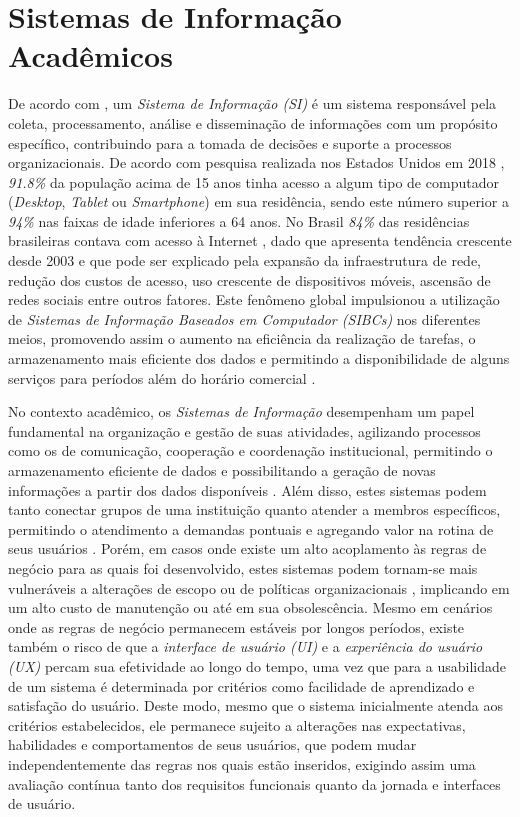 \documentclass[nonacm, sigconf]{acmart}
\begin{document}
\section{Sistemas de Informação Acadêmicos}
\label{section:academic-information-systems}

De acordo com \cite{rainer2015introducao}, um \textit{Sistema de Informação (SI)} é um sistema responsável pela coleta, processamento, análise e disseminação de informações com um propósito específico, contribuindo para a tomada de decisões e suporte a processos organizacionais. De acordo com pesquisa realizada nos Estados Unidos em 2018 \cite{martin2021computer}, \textit{91.8\%} da população acima de 15 anos tinha acesso a algum tipo de computador (\textit{Desktop}, \textit{Tablet} ou \textit{Smartphone}) em sua residência, sendo este número superior a \textit{94\%} nas faixas de idade inferiores a 64 anos. No Brasil \textit{84\%} das residências brasileiras contava com acesso à Internet \cite{ticbr2023}, dado que apresenta tendência crescente desde 2003 e que pode ser explicado pela expansão da infraestrutura de rede, redução dos custos de acesso, uso crescente de dispositivos móveis, ascensão de redes sociais entre outros fatores. Este fenômeno global impulsionou a utilização de \textit{Sistemas de Informação Baseados em Computador (SIBCs)} nos diferentes meios, promovendo assim o aumento na eficiência da realização de tarefas, o armazenamento mais eficiente dos dados e permitindo a disponibilidade de alguns serviços para períodos além do horário comercial \cite{katarina2015}.

No contexto acadêmico, os \textit{Sistemas de Informação} desempenham um papel fundamental na organização e gestão de suas atividades, agilizando processos como os de comunicação, cooperação e coordenação institucional, permitindo o armazenamento eficiente de dados e possibilitando a geração de novas informações a partir dos dados disponíveis \cite{murdick1984information}. Além disso, estes sistemas podem tanto conectar grupos de uma instituição quanto atender a membros específicos, permitindo o atendimento a demandas pontuais e agregando valor na rotina de seus usuários \cite{rainer2015introducao}. Porém, em casos onde existe um alto acoplamento às regras de negócio para as quais foi desenvolvido, estes sistemas podem tornam-se mais vulneráveis a alterações de escopo ou de políticas organizacionais \cite{sis}, implicando em um alto custo de manutenção ou até em sua obsolescência. Mesmo em cenários onde as regras de negócio permanecem estáveis por longos períodos, existe também o risco de que a \textit{interface de usuário (UI)} e a \textit{experiência do usuário (UX)} percam sua efetividade ao longo do tempo, uma vez que para \cite{nielsen1994usability} a usabilidade de um sistema é determinada por critérios como facilidade de aprendizado e satisfação do usuário. Deste modo, mesmo que o sistema inicialmente atenda aos critérios estabelecidos, ele permanece sujeito a alterações nas expectativas, habilidades e comportamentos de seus usuários, que podem mudar independentemente das regras nos quais estão inseridos, exigindo assim uma avaliação contínua tanto dos requisitos funcionais quanto da jornada e interfaces de usuário.
\end{document}
